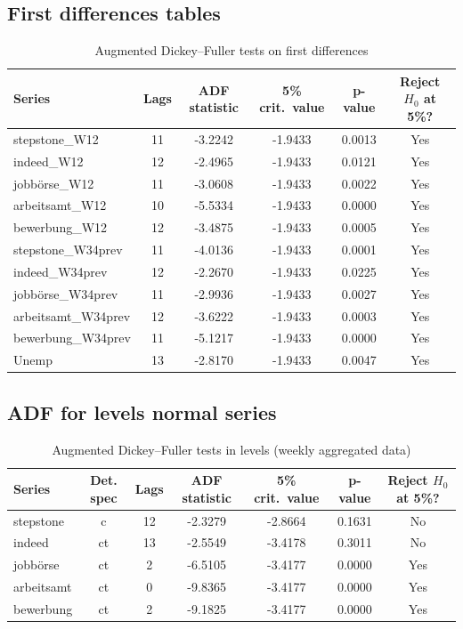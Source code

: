 \documentclass[12pt,a4paper]{article}
\begin{document}
\subsection{First differences tables}
\begin{table}[htbp]
\centering
\caption{Augmented Dickey--Fuller tests on first differences }
\label{tab:adf_diff1_n}
\begin{tabular}{lccccc}
\hline\hline
Series & Lags & ADF statistic & 5\% crit.\ value & p-value & Reject $H_0$ at 5\%? \\
\hline
stepstone\_W12      & 11 & -3.2242 & -1.9433 & 0.0013 & Yes \\
indeed\_W12         & 12 & -2.4965 & -1.9433 & 0.0121 & Yes \\
jobbörse\_W12       & 11 & -3.0608 & -1.9433 & 0.0022 & Yes \\
arbeitsamt\_W12     & 10 & -5.5334 & -1.9433 & 0.0000 & Yes \\
bewerbung\_W12      & 12 & -3.4875 & -1.9433 & 0.0005 & Yes \\
stepstone\_W34prev  & 11 & -4.0136 & -1.9433 & 0.0001 & Yes \\
indeed\_W34prev     & 12 & -2.2670 & -1.9433 & 0.0225 & Yes \\
jobbörse\_W34prev   & 11 & -2.9936 & -1.9433 & 0.0027 & Yes \\
arbeitsamt\_W34prev & 12 & -3.6222 & -1.9433 & 0.0003 & Yes \\
bewerbung\_W34prev  & 11 & -5.1217 & -1.9433 & 0.0000 & Yes \\
Unemp               & 13 & -2.8170 & -1.9433 & 0.0047 & Yes \\
\hline\hline
\end{tabular}
\end{table}

\subsection{ADF for levels normal series}
\begin{table}[htbp]
\centering
\caption{Augmented Dickey--Fuller tests in levels (weekly aggregated data)}
\label{tab:adf_levels_weekly}
\begin{tabular}{lcccccc}
\hline\hline
Series & Det. spec & Lags & ADF statistic & 5\% crit.\ value & p-value & Reject $H_0$ at 5\%? \\
\hline
stepstone        & c  & 12 & -2.3279 & -2.8664 & 0.1631 & No \\
indeed           & ct & 13 & -2.5549 & -3.4178 & 0.3011 & No \\
jobbörse         & ct &  2 & -6.5105 & -3.4177 & 0.0000 & Yes \\
arbeitsamt       & ct &  0 & -9.8365 & -3.4177 & 0.0000 & Yes \\
bewerbung        & ct &  2 & -9.1825 & -3.4177 & 0.0000 & Yes \\
\hline\hline
\end{tabular}
\end{table}
\end{document}
